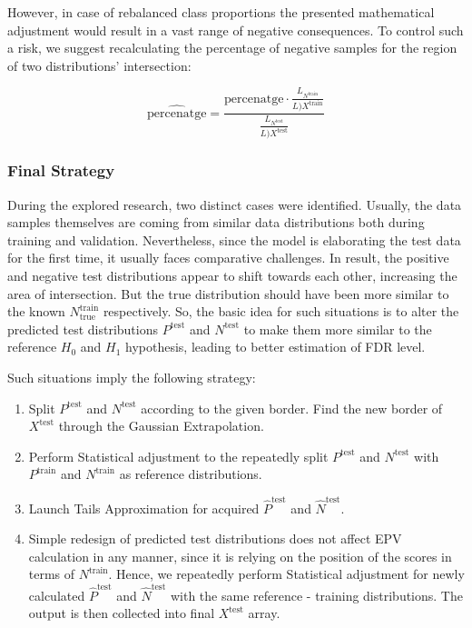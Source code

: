 \documentclass{article}
\begin{document}
However, in case of rebalanced class proportions the presented mathematical adjustment would result in a vast range of negative consequences. To control such a risk, we suggest recalculating the percentage of negative samples for the region of two distributions' intersection:

\[\hat{\text{percenatge}} = \frac{\text{percenatge} \cdot \frac{L_{N^{\text{train}}}}{L){X^{\text{train}}}}}{\frac{L_{N^{\text{test}}}}{L){X^{\text{test}}}}}\]

\subsubsection{Final Strategy}

During the explored research, two distinct cases were identified. Usually, the data samples themselves are coming from similar data distributions both during training and validation. Nevertheless, since the model is elaborating the test data for the first time, it usually faces comparative challenges. In result, the positive and negative test distributions appear to shift towards each other, increasing the area of intersection. But the true distribution should have been more similar to the known $N^{\text{train}}_{\text{true}}$ respectively. So, the basic idea for such situations is to alter the predicted test distributions $P^{\text{test}}$ and $N^{\text{test}}$ to make them more similar to the reference $H_0$ and $H_1$ hypothesis, leading to better estimation of FDR level. 

Such situations imply the following strategy:

\begin{enumerate}
    \item Split $P^{\text{test}}$ and $N^{\text{test}}$ according to the given border. Find the new border of $X^{\text{test}}$ through the Gaussian Extrapolation. 
    \item Perform Statistical adjustment to the repeatedly split $P^{\text{test}}$ and $N^{\text{test}}$ with $P^{\text{train}}$ and $N^{\text{train}}$ as reference distributions. 
    \item Launch Tails Approximation for acquired $\hat{P}^{\text{test}}$ and $\hat{N}^{\text{test}}$. 
    \item Simple redesign of predicted test distributions does not affect EPV calculation in any manner, since it is relying on the position of the scores in terms of $N^{\text{train}}$. Hence, we repeatedly perform Statistical adjustment for newly calculated $\hat{P}^{\text{test}}$ and $\hat{N}^{\text{test}}$ with the same reference - training distributions. The output is then collected into final $X^{\text{test}}$ array.
\end{enumerate}
\end{document}
